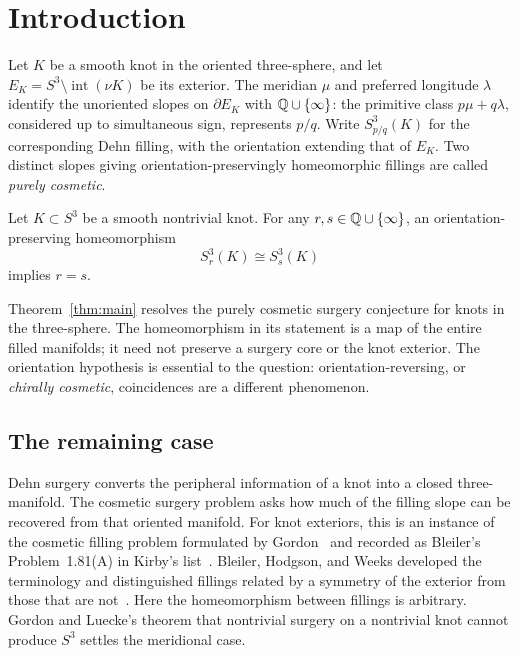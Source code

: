 \section{Introduction}\label{sec:introduction}

Let $K$ be a smooth knot in the oriented three-sphere, and let
$E_K=S^3\setminus\operatorname{int}(\nu K)$ be its exterior.
The meridian $\mu$ and preferred longitude $\lambda$ identify the unoriented
slopes on $\partial E_K$ with $\mathbb Q\cup\{\infty\}$: the primitive class
$p\mu+q\lambda$, considered up to simultaneous sign, represents $p/q$.
Write $S^3_{p/q}(K)$ for the corresponding Dehn filling, with the orientation
extending that of $E_K$.
Two distinct slopes giving orientation-preservingly homeomorphic fillings
are called \emph{purely cosmetic}.

\begin{theorem}\label{thm:main}
Let $K\subset S^3$ be a smooth nontrivial knot. For any
$r,s\in\mathbb Q\cup\{\infty\}$, an orientation-preserving homeomorphism
\[
 S^3_r(K)\cong S^3_s(K)
\]
implies $r=s$.
\end{theorem}

Theorem~\ref{thm:main} resolves the purely cosmetic surgery conjecture for
knots in the three-sphere. The homeomorphism in its statement is a map of
the entire filled manifolds; it need not preserve a surgery core or the
knot exterior. The orientation hypothesis is essential to the question:
orientation-reversing, or \emph{chirally cosmetic}, coincidences are a
different phenomenon.

\subsection{The remaining case}

Dehn surgery converts the peripheral information of a knot into a closed
three-manifold. The cosmetic surgery problem asks how much of the filling
slope can be recovered from that oriented manifold. For knot exteriors,
this is an instance of the cosmetic filling problem formulated by
Gordon~\cite[Conjecture~6.1]{Gordon1991} and recorded as Bleiler's
Problem~1.81(A) in Kirby's list~\cite{Kirby1997}.
Bleiler, Hodgson, and Weeks developed the terminology and distinguished
fillings related by a symmetry of the exterior from those that are
not~\cite{BleilerHodgsonWeeks1999}.  Here the homeomorphism between
fillings is arbitrary.  Gordon and Luecke's theorem that nontrivial
surgery on a nontrivial knot cannot produce $S^3$
\cite[Theorem~2]{GordonLuecke1989} settles the meridional case.

